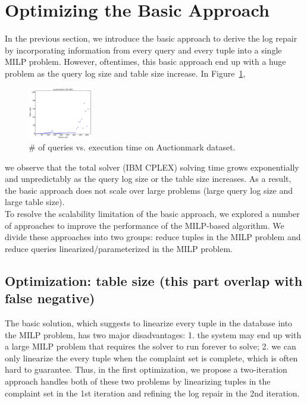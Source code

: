 \section{Optimizing the Basic Approach}
\label{sec:opt}

In the previous section, we introduce the basic approach to derive
the log repair by incorporating information from every query
and every tuple into a single MILP problem. However, oftentimes, 
this basic approach end up with 
a huge problem as the query log size and table size increase. 
In Figure~\ref{fig:querysize_vs_time}, 
\begin{figure}
    \centering
        \includegraphics[width=0.25\textwidth]{figures/auctionmark_qsize_time}
    \caption{\# of queries vs. execution time on Auctionmark dataset. }
    \label{fig:querysize_vs_time}
\end{figure}
we observe that the total solver (IBM CPLEX) solving time 
grows exponentially and 
unpredictably as the query 
log size or the table size increases. As a result, the basic approach does not scale over 
large problems (large query log size and large table size).\\
To resolve the scalability limitation of the basic approach, 
we explored a number of approaches to improve the performance of the 
MILP-based algorithm. We divide these approaches into two groups:
reduce tuples in the MILP problem and reduce queries linearized/parameterized in
the MILP problem. \\

\subsection{Optimization: table size (this part overlap with false negative)}
\label{sec:opt:tbsize}
The basic solution, which suggests to linearize every tuple in the database into the MILP problem,
has two major disadvantages: 1. the system may end up with a large MILP problem that requires 
the solver to run forever to solve; 2. we can only linearize the every tuple
when the complaint set is complete, which is often hard to guarantee. Thus, in the first 
optimization, we propose a two-iteration approach handles both of these two problems 
by linearizing tuples in the complaint set in
the 1st iteration and refining the log repair in the 2nd iteration. \\
